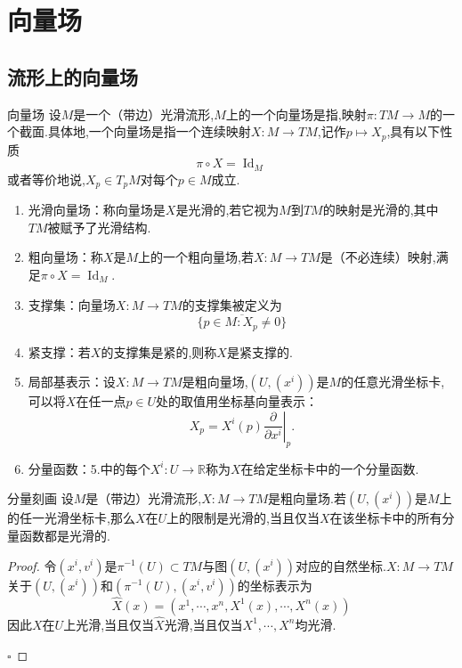 \documentclass[../../几何与拓扑.tex]{subfiles}
\begin{document}
    
\chapter{向量场}

\section{流形上的向量场}

\begin{definition}{向量场}
    设$M$是一个（带边）光滑流形,$M$上的一个向量场是指,映射$\pi:TM\to M$的一个截面.具体地,一个向量场是指一个连续映射$X:M\to TM$,记作$p\mapsto X_{p}$,具有以下性质 $$ \pi \circ X=\operatorname{Id}_{M} $$或者等价地说,$X_{p}\in T_{p}M$对每个$p \in M$成立.
\end{definition}

\begin{remark}
    \begin{enumerate}
        \item 光滑向量场：称向量场是$X$是光滑的,若它视为$M$到$TM$的映射是光滑的,其中$TM$被赋予了光滑结构.
        \item 粗向量场：称$X$是$M$上的一个粗向量场,若$X:M\to TM$是（不必连续）映射,满足$\pi \circ X= \operatorname{Id}_{M}$.
        \item 支撑集：向量场$X:M\to TM$的支撑集被定义为 $$ \overline{\{ p \in M:X_{p}\neq 0 \}} $$
        \item 紧支撑：若$X$的支撑集是紧的,则称$X$是紧支撑的.
        \item 局部基表示：设$X:M\to TM$是粗向量场,$\left( U,\left( x^{i} \right) \right)$是$M$的任意光滑坐标卡,可以将$X$在任一点$p \in U$处的取值用坐标基向量表示： $$ X_{p}= X^{i}\left( p \right) \left. \frac{ \partial  }{ \partial x^{i} }  \right|_{p}.  $$
        \item 分量函数：5.中的每个$X^{i}:U\to \mathbb{R}$称为$X$在给定坐标卡中的一个分量函数.
    \end{enumerate}
    
\end{remark}

\begin{proposition}{分量刻画}
    设$M$是（带边）光滑流形,$X:M\to TM$是粗向量场.若$\left( U,\left( x^{i} \right) \right)$是$M$上的任一光滑坐标卡,那么$X$在$U$上的限制是光滑的,当且仅当$X$在该坐标卡中的所有分量函数都是光滑的.
\end{proposition}
\begin{proof}
    令$\left( x^{i},v^{i} \right)$是$\pi ^{-1}\left( U \right) \subset  TM$与图$\left( U,\left( x^{i} \right) \right)$对应的自然坐标.$X:M\to TM$关于$\left( U,\left( x^{i} \right) \right)$和$\left( \pi ^{-1}\left( U \right) ,\left( x^{i},v^{i} \right)\right)$的坐标表示为 $$ \hat{X}\left( x \right) =\left( x^{1},{\cdots},x^{n},X^{1}\left( x \right) ,{\cdots},X^{n}\left( x \right)  \right)  $$因此$X$在$U$上光滑,当且仅当$\hat{X}$光滑,当且仅当$X^{1},{\cdots},X^{n}$均光滑.

    \hfill $\square$
\end{proof}
\end{document}
